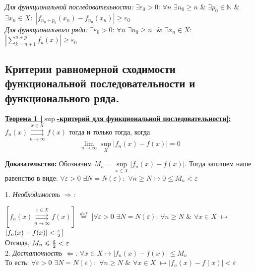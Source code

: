 \documentclass[a4paper,12pt]{article} %
\renewcommand {\geq}{\geqslant}
\renewcommand {\leq}{\leqslant}
\begin{document}
\textit{Для функциональной последовательности:}
\newline
$\exists \varepsilon_0 > 0$: $\forall n$ $\exists n_0 \geq n$ $\& $ $\exists  p_0 \in \mathds{N}$ $\&$ $\exists x_n \in X:$ $|f_{n_0+p_0}(x_n) - f_{n_0}(x_n)| \geq \varepsilon_0$ 
\\[5mm] 
\textit{Для функционального ряда:}
\newline
$\exists \varepsilon_0 > 0$: $\forall n$ $\exists n_0 \geq n \text{ }\& $ $\exists x_n \in X:$ $|\sum\limits_{k = n+1}^{n+p}f_k(x)| \geq \varepsilon_0$ 

\subsection{Критерии равномерной сходимости функциональной последовательности и функционального ряда.}

\underline{\textbf{Теорема 1 [$\sup$-критерий для функциональной последовательности]:}}\newline 
$f_n(x) \overset{x \in X}{\underset{n \rightarrow \infty}{\rightrightarrows}} f(x)$ тогда и только тогда, когда $$\lim\limits_{n \rightarrow \infty} \sup_{X}|f_n(x)-f(x)| = 0$$

\textbf{Доказательство:} 
\newline
Обозначим $M_n = \sup\limits_{x \in X}{|f_n(x)-f(x)|}$. \newline
Тогда запишем  наше равенство в виде: \newline
\hspace*{40mm}$\forall \varepsilon > 0$ $\exists N = N(\varepsilon):$ $\forall n \geq N \mapsto 0 \leq M_n < \varepsilon$ \newline

 1. \textit{Необходимость $\Rightarrow$:} \newline
 
 $[f_n(x) \overset{x \in X}{\underset{n \rightarrow \infty}{\rightrightarrows}} f(x)]$ $\stackrel{def}{=}$ $\big[\forall \varepsilon > 0 $  $\exists N = N(\varepsilon)$: $\forall n \geq N$  $\&$  $\forall x \in X$ $\longmapsto$ $|f_n(x) -f(x)| < {\varepsilon \over 2} \big]$
 \\[5 mm]
 Отсюда, $M_n \leq {\varepsilon \over 2 } < \varepsilon$
\\[ 5 mm]
2. \textit{Достаточность $\Leftarrow$:} \newline
\hspace*{5mm}$\forall x \in X \longmapsto |f_n(x)-f(x)|\leq M_n$ 
\\[ 5 mm]
То есть: \newline
\hspace*{20mm}$\forall \varepsilon > 0$  $\exists N = N(\varepsilon):$  $\forall n \geq N$ $\&$ $\forall x \in X$ $\longmapsto |f_n(x)-f(x)| < \varepsilon$ \newline
\end{document}
